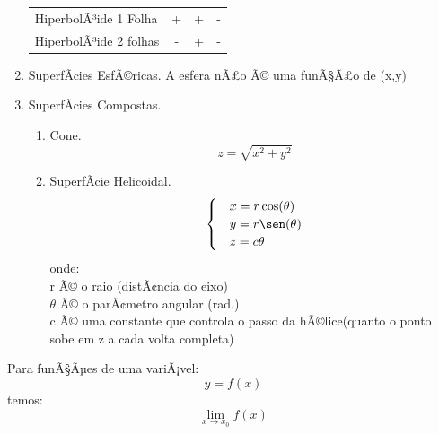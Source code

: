 \begin{enumerate}
\begin{table}[H]
\begin{tabular}{lccc}
HiperbolÃ³ide 1 Folha  & +          & +         & -\\
HiperbolÃ³ide 2 folhas & -          & +         & -\\ 
\bottomrule
\end{tabular}
\end{table}
  \item SuperfÃ­cies EsfÃ©ricas.
  A esfera nÃ£o Ã© uma funÃ§Ã£o de (x,y)
  \item SuperfÃ­cies Compostas.
      \begin{enumerate}
        \item Cone.
        \[ z=\sqrt{x^2+y^2} \]
        \item SuperfÃ­cie Helicoidal.
        \[\begin{cases}
          &x=r\cos(\theta)\\
          &y=r\sen(\theta)\\
          &z=c\theta\\
        \end{cases}\]
        onde:\\
        r Ã© o raio (distÃ¢ncia do eixo)\\
        $\theta$ Ã© o parÃ¢metro angular (rad.)\\
        c Ã© uma constante que controla o passo da hÃ©lice(quanto o ponto
        sobe em z a cada volta completa)
      \end{enumerate}
\end{enumerate}
Para funÃ§Ãµes de uma variÃ¡vel:
\[ y=f(x) \] temos:
\[
\lim_{x\rightarrow x_0} f(x)
\]

